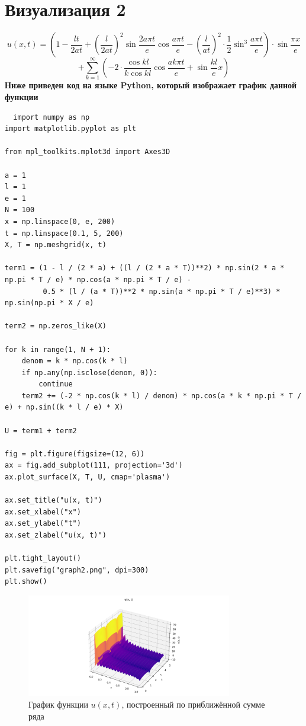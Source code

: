 \documentclass[a4paper,12pt]{article}
\begin{document}
\section*{Визуализация 2}
$$u(x,t) = \left(1 - \frac{lt}{2at} + \left(\frac{l}{2at}\right)^2 \sin \frac{2a\pi t}{e} \cos \frac{a\pi t}{e} - \left(\frac{l}{at}\right)^2 \cdot \frac{1}{2} \sin^3 \frac{a\pi t}{e} \right) \cdot \sin \frac{\pi x}{e}$$
$$ + \sum_{k=1}^{\infty} \left( -2 \cdot \frac{\cos kl}{k \cos kl} \cos \frac{a k \pi t}{e} + \sin \frac{kl}{e} x \right)$$
\textbf{Ниже приведен код на языке Python, который изображает график данной функции}
\begin{lstlisting}
  import numpy as np
import matplotlib.pyplot as plt

from mpl_toolkits.mplot3d import Axes3D

a = 1
l = 1
e = 1
N = 100  
x = np.linspace(0, e, 200)
t = np.linspace(0.1, 5, 200)
X, T = np.meshgrid(x, t)

term1 = (1 - l / (2 * a) + ((l / (2 * a * T))**2) * np.sin(2 * a * np.pi * T / e) * np.cos(a * np.pi * T / e) -
         0.5 * (l / (a * T))**2 * np.sin(a * np.pi * T / e)**3) * np.sin(np.pi * X / e)

term2 = np.zeros_like(X)

for k in range(1, N + 1):
    denom = k * np.cos(k * l)
    if np.any(np.isclose(denom, 0)):
        continue
    term2 += (-2 * np.cos(k * l) / denom) * np.cos(a * k * np.pi * T / e) + np.sin((k * l / e) * X)

U = term1 + term2

fig = plt.figure(figsize=(12, 6))
ax = fig.add_subplot(111, projection='3d')
ax.plot_surface(X, T, U, cmap='plasma')

ax.set_title("u(x, t)")
ax.set_xlabel("x")
ax.set_ylabel("t")
ax.set_zlabel("u(x, t)")

plt.tight_layout()
plt.savefig("graph2.png", dpi=300)
plt.show()

\end{lstlisting}
\begin{figure}[H]
    \centering
    \includegraphics[width=0.8\textwidth]{../../graph2.png}
    \caption{График функции $u(x,t)$, построенный по приближённой сумме ряда}
\end{figure}
\end{document}
